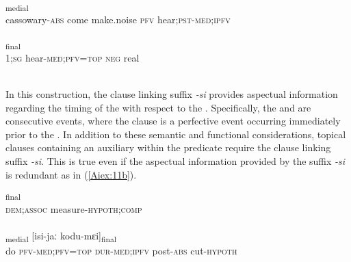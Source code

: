 \documentclass[output=paper]{LSP/langsci}
\begin{document}
\begin{exe}
\ex \label{Aiex:10ab}
\begin{xlist}
\ex \label{Aiex:10a}
\textsubscript{medial}\\
cassowary-\textsc{abs}	come	make.noise	\textsc{pfv}	hear;\textsc{pst}-\textsc{med};\textsc{ipfv}\\
\glt {}\\
\ex \label{Aiex:10b}
\textsubscript{final}\\
1;\textsc{sg}	hear-\textsc{med};\textsc{pfv}=\textsc{top}	\textsc{neg}	real\\
\glt {}\\
\end{xlist}
\end{exe}

In this construction, the clause linking suffix \textit{-si} provides aspectual information regarding the timing of the  with respect to the . Specifically, the  and  are consecutive events, where the  clause is a perfective event occurring immediately prior to the .
	In addition to these semantic and functional considerations, topical clauses containing an auxiliary within the predicate require the clause linking suffix  \textit{-si}. This is true even if the aspectual information provided by the suffix  \textit{-si} is redundant as in (\ref{Aiex:11b}).

\begin{exe}
\ex \label{Aiex:11ab}
\begin{xlist}
\ex \label{Aiex:11a}
\textsubscript{final}\\
\textsc{dem};\textsc{assoc}	measure-\textsc{hypoth};\textsc{comp}\\
\glt {}\\
\ex \label{Aiex:11b}
\textsubscript{medial}	[isi-jaː	kodu-mɛi]\textsubscript{final}\\
do	\textsc{pfv}-\textsc{med};\textsc{pfv}=\textsc{top}	\textsc{dur}-\textsc{med};\textsc{ipfv}	post-\textsc{abs}	cut-\textsc{hypoth}\\
\glt {}\\
\end{xlist}
\end{exe}
\end{document}
